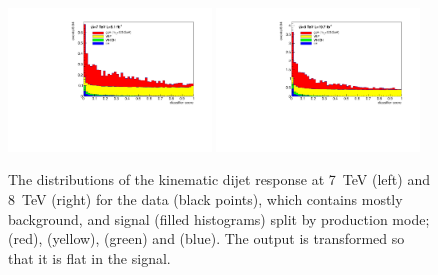 \begin{figure}
  \includegraphics[width=0.48\textwidth]{selec_and_cats/plots/dijetbdt_transformed_signal_7TeV_fix.pdf}
  \includegraphics[width=0.48\textwidth]{selec_and_cats/plots/dijetbdt_transformed_signal_8TeV_fix.pdf} 
  \caption[The kinematic dijet \BDT response]{The distributions of the kinematic dijet \BDT response at 7~TeV (left) and 8~TeV (right) for the data (black points), which contains mostly background, and signal (filled histograms) split by production mode; \ggH (red), \VBF (yellow), \VH (green) and \ttH (blue). The output is transformed so that it is flat in the \VBF signal.}
  \label{fig:vbf_dijet_kin}
\end{figure}

